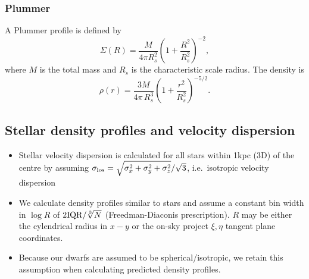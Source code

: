 \subsubsection{Plummer}\label{plummer}

A Plummer profile is defined by \[
\Sigma(R) = \frac{M}{4\pi R_s^2} \left(1 + \frac{R^2}{R_s^2}\right)^{-2} ,
\] where \(M\) is the total mass and \(R_s\) is the characteristic scale
radius. The density is \[
\rho(r) = \frac{3M}{4\pi\,R_s^3} \left(1 + \frac{r^2}{R_s^2}\right)^{-5/2}.
\]

\subsection{Stellar density profiles and velocity
dispersion}\label{stellar-density-profiles-and-velocity-dispersion}

\begin{itemize}
\tightlist
\item
  Stellar velocity dispersion is calculated for all stars within 1kpc
  (3D) of the centre by assuming
  \(\sigma_{\rm los} = \sqrt{\sigma_x^2 + \sigma_y^2 + \sigma_z^2}/ \sqrt 3\),
  i.e.~isotropic velocity dispersion
\item
  We calculate density profiles similar to stars and assume a constant
  bin width in \(\log R\) of \(2 {\rm IQR} / \sqrt[3]{N}\)
  (Freedman-Diaconis prescription). \(R\) may be either the cylendrical
  radius in \(x-y\) or the on-sky project \(\xi, \eta\) tangent plane
  coordinates.
\item
  Because our dwarfs are assumed to be spherical/isotropic, we retain
  this assumption when calculating predicted density profiles.
\end{itemize}

